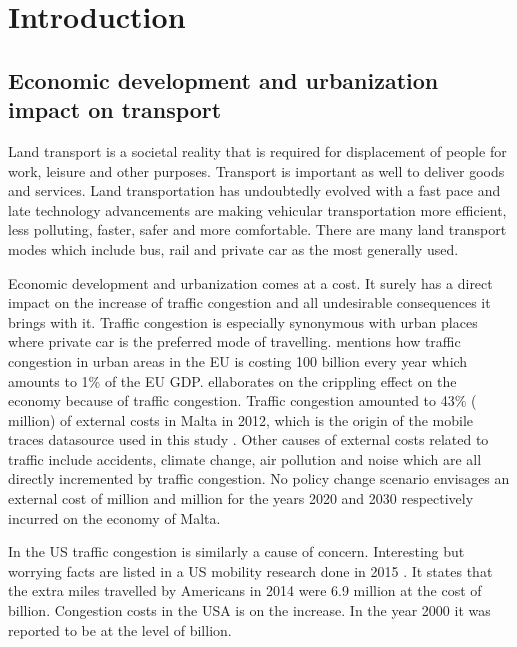 \documentclass[12pt, a4paper]{report}
\theoremstyle{definition}
\theoremstyle{definition}%
\theoremstyle{definition}%
\theoremstyle{definition}%
\theoremstyle{definition}%
\theoremstyle{definition}%
\begin{document}
\chapter{Introduction} \label{chapter:introduction}

\section{Economic development and urbanization impact on transport} \label{section:introduction:economic_development}

Land transport is a societal reality that is required for displacement of people for work, 
leisure and other purposes. Transport is important as well to deliver goods and services. Land transportation has undoubtedly evolved with a fast pace and late technology advancements are making vehicular transportation more efficient, less polluting, faster, safer and more comfortable. There are many land transport modes which include bus, rail and private car as the most generally used.

Economic development and urbanization comes at a cost. It surely has a direct impact on the increase of traffic congestion and all undesirable consequences it brings with it. Traffic congestion is especially synonymous with urban places where private car is the preferred mode of travelling. \cite{EUTransportDirectorate2018} mentions how traffic congestion in urban areas in the EU is costing 100 billion every year which amounts to 1\% of the EU GDP. \cite{Colak2015} ellaborates on the crippling effect on the economy because of traffic congestion. Traffic congestion amounted to 43\% ( million) of external costs in Malta in 2012, which is the origin of the mobile traces datasource used in this study \cite{Attard2015}. Other causes of external costs related to traffic include accidents, climate change, air pollution and noise which are all directly incremented by traffic congestion. No policy change scenario envisages an external cost of  million and  million for the years 2020 and 2030 respectively incurred on the economy of Malta.

In the US traffic congestion is similarly a cause of concern. Interesting but worrying facts are listed in a US mobility research done in 2015 \cite{Schrank.2015}. It states that the extra miles travelled by Americans in 2014 were 6.9 million at the cost of  billion. Congestion costs in the USA is on the increase. In the year 2000 it was reported to be at the level of  billion.
\end{document}
